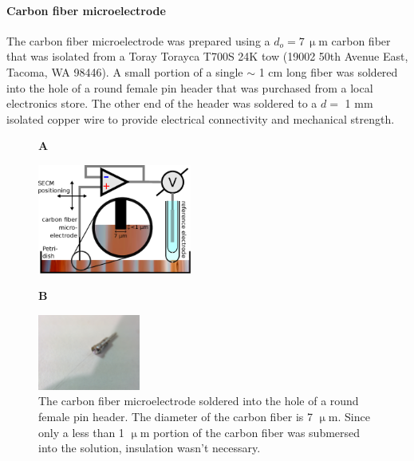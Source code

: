 \documentclass[3p, twocolumn]{elsarticle}
\begin{document}
\paragraph{Carbon fiber microelectrode} The carbon fiber microelectrode was prepared using a $d_o = 7\, \upmu$m carbon fiber that was isolated from a Toray Torayca T700S 24K tow (19002 50th Avenue East, Tacoma, WA 98446).
A small portion of a single $\sim$ 1 cm long fiber was soldered into the hole of a round female pin header that was purchased from a local electronics store. 
The other end of the header was soldered to a $d = $ 1 mm isolated copper wire to provide electrical connectivity and mechanical strength. 

\begin{figure}
\centering
\begin{flushleft}
\textbf{A}
\end{flushleft}

\includegraphics[width=0.45\textwidth]{setup.eps}

\begin{flushleft}
\textbf{B}
\end{flushleft}

\includegraphics[trim = 200mm 100mm 150mm 200mm, clip, width=0.3\textwidth]{microelectrode.jpg}

\caption{The carbon fiber microelectrode soldered into the hole of a round female pin header. The diameter of the carbon fiber is 7 $\upmu$m. Since only a less than 1 $\upmu$m portion of the carbon fiber was submersed into the solution, insulation wasn't necessary.}
\label{fig:setup}
\end{figure}
\end{document}
